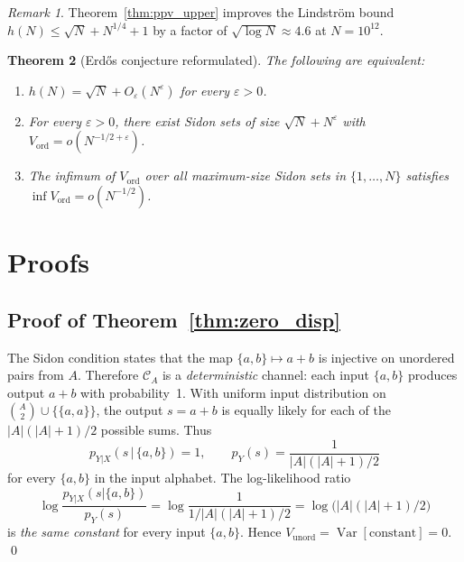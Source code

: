 \documentclass[11pt]{amsart}
\theoremstyle{plain}
\newtheorem{theorem}{Theorem}[section]
\theoremstyle{definition}
\theoremstyle{remark}
\newtheorem{remark}[theorem]{Remark}
\begin{document}
\begin{remark}
Theorem~\ref{thm:ppv_upper} improves the Lindstr\"om bound $h(N) \le
\sqrt{N} + N^{1/4} + 1$ by a factor of $\sqrt{\log N} \approx 4.6$ at
$N = 10^{12}$.
\end{remark}

\begin{theorem}[Erdős conjecture reformulated]\label{thm:erdos_equiv}
The following are equivalent:
\begin{enumerate}
\item[\rm(a)] $h(N) = \sqrt{N} + O_\varepsilon(N^\varepsilon)$ for every $\varepsilon > 0$.
\item[\rm(b)] For every $\varepsilon > 0$, there exist Sidon sets of size
  $\sqrt{N} + N^\varepsilon$ with $V_{\mathrm{ord}} = o(N^{-1/2+\varepsilon})$.
\item[\rm(c)] The infimum of $V_{\mathrm{ord}}$ over all maximum-size Sidon
  sets in $\{1,\ldots,N\}$ satisfies $\inf V_{\mathrm{ord}} = o(N^{-1/2})$.
\end{enumerate}
\end{theorem}

\section{Proofs}

\subsection{Proof of Theorem~\ref{thm:zero_disp}}

The Sidon condition states that the map $\{a,b\} \mapsto a+b$ is injective
on unordered pairs from $A$.  Therefore $\mathcal{C}_A$ is a
\emph{deterministic} channel: each input $\{a,b\}$ produces output $a+b$
with probability~1.  With uniform input distribution on $\binom{A}{2} \cup
\{\{a,a\}\}$, the output $s = a+b$ is equally likely for each of the
$|A|(|A|+1)/2$ possible sums.  Thus
\[
  p_{Y|X}(s \,|\, \{a,b\}) = 1, \qquad
  p_Y(s) = \frac{1}{|A|(|A|+1)/2}
\]
for every $\{a,b\}$ in the input alphabet.  The log-likelihood ratio
\[
  \log \frac{p_{Y|X}(s|\{a,b\})}{p_Y(s)}
  = \log \frac{1}{1/|A|(|A|+1)/2}
  = \log\bigl(|A|(|A|+1)/2\bigr)
\]
is \emph{the same constant} for every input $\{a,b\}$.  Hence
$V_{\mathrm{unord}} = \operatorname{Var}[\text{constant}] = 0$. \qed
\end{document}
